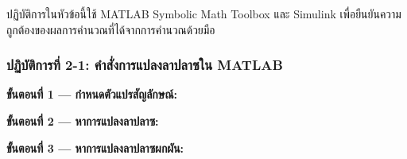 ปฏิบัติการในหัวข้อนี้ใช้ MATLAB Symbolic Math Toolbox และ Simulink
เพื่อยืนยันความถูกต้องของผลการคำนวณที่ได้จากการคำนวณด้วยมือ

\subsubsection{ปฏิบัติการที่ 2-1: คำสั่งการแปลงลาปลาซใน
MATLAB}\label{uxe1buxe0fuxe1auxe15uxe01uxe32uxe23uxe17-2-1-uxe04uxe33uxe2auxe07uxe01uxe32uxe23uxe41uxe1buxe25uxe07uxe25uxe32uxe1buxe25uxe32uxe0buxe43uxe19-matlab}

\textbf{ขั้นตอนที่ 1 --- กำหนดตัวแปรสัญลักษณ์:}

\begin{Shaded}
\begin{Highlighting}[]
    \OperatorTok{;}
\end{Highlighting}
\end{Shaded}

\textbf{ขั้นตอนที่ 2 --- หาการแปลงลาปลาซ:}

\begin{Shaded}
\begin{Highlighting}[]
 \OperatorTok{=} \OperatorTok{*}\NormalTok{(}\OperatorTok{{-}}\OperatorTok{*}\NormalTok{) }\OperatorTok{+} \OperatorTok{*}\NormalTok{(}\OperatorTok{*}\NormalTok{)}\OperatorTok{;}
 \OperatorTok{=} \NormalTok{(}\OperatorTok{,} \OperatorTok{,} \NormalTok{)   }
\end{Highlighting}
\end{Shaded}

\textbf{ขั้นตอนที่ 3 --- หาการแปลงลาปลาซผกผัน:}

\begin{Shaded}
\begin{Highlighting}[]
 \OperatorTok{=}\NormalTok{ (}\OperatorTok{+}\NormalTok{)}\OperatorTok{/}\NormalTok{((}\OperatorTok{+}\NormalTok{)}\OperatorTok{*}\NormalTok{(}\OperatorTok{+}\NormalTok{))}\OperatorTok{;}
 \OperatorTok{=} \NormalTok{(}\OperatorTok{,} \OperatorTok{,} \NormalTok{)  }
\end{Highlighting}
\end{Shaded}

